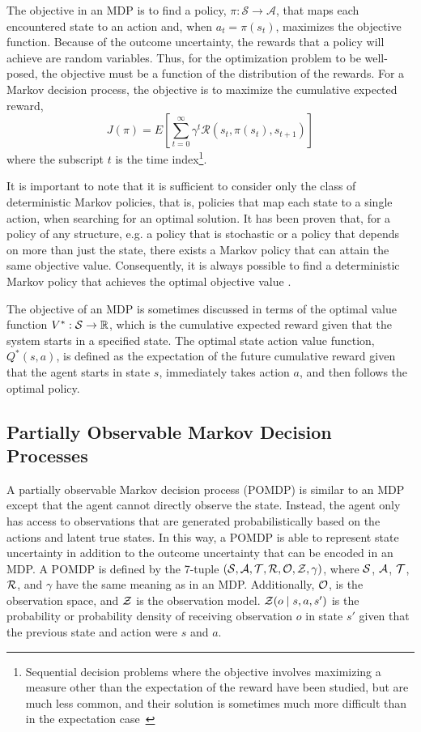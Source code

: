 The objective in an MDP is to find a policy, $\pi: \mathcal{S} \to \mathcal{A}$, that maps each encountered state to an action and, when $a_t = \pi(s_t)$, maximizes the objective function.
Because of the outcome uncertainty, the rewards that a policy will achieve are random variables.
Thus, for the optimization problem to be well-posed, the objective must be a function of the distribution of the rewards.
For a Markov decision process, the objective is to maximize the cumulative expected reward,
\begin{equation} \label{eq:cumulative}
    J(\pi) = E\left[\sum_{t=0}^\infty \gamma^t \mathcal{R}(s_t, \pi(s_t), s_{t+1})\right]
\end{equation}
where the subscript $t$ is the time index\footnote{Sequential decision problems where the objective involves maximizing a measure other than the expectation of the reward have been studied, but are much less common, and their solution is sometimes much more difficult than in the expectation case~\cite{chow2015risk}}.

It is important to note that it is sufficient to consider only the class of deterministic Markov policies, that is, policies that map each state to a single action, when searching for an optimal solution.
It has been proven that, for a policy of any structure, e.g. a policy that is stochastic or a policy that depends on more than just the state, there exists a Markov policy that can attain the same objective value.
Consequently, it is always possible to find a deterministic Markov policy that achieves the optimal objective value \cite{EA:99}.

The objective of an MDP is sometimes discussed in terms of the optimal value function $V^*: \mathcal{S} \to \mathbb{R}$, which is the cumulative expected reward given that the system starts in a specified state.
The optimal state action value function, $Q^*(s,a)$, is defined as the expectation of the future cumulative reward given that the agent starts in state $s$, immediately takes action $a$, and then follows the optimal policy.

\subsection{Partially Observable Markov Decision Processes} \label{sec:pomdps}

A partially observable Markov decision process (POMDP) is similar to an MDP except that the agent cannot directly observe the state.
Instead, the agent only has access to observations that are generated probabilistically based on the actions and latent true states.
In this way, a POMDP is able to represent state uncertainty in addition to the outcome uncertainty that can be encoded in an MDP.
A POMDP is defined by the 7-tuple $(\mathcal{S}, \mathcal{A}, \mathcal{T}, \mathcal{R}, \mathcal{O}, \mathcal{Z}, \gamma)$, where $\mathcal{S}$, $\mathcal{A}$, $\mathcal{T}$, $\mathcal{R}$, and $\gamma$ have the same meaning as in an MDP.
Additionally, $\mathcal{O}$, is the observation space, and $\mathcal{Z}$ is the observation model.
$\mathcal{Z}(o \mid s, a, s')$ is the probability or probability density of receiving observation $o$ in state $s'$ given that the previous state and action were $s$ and $a$.

